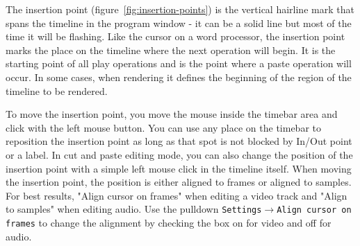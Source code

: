 The insertion point (figure~\ref{fig:insertion-points}) is the vertical hairline mark that spans the timeline in the program window - it can be a solid line but most of the time it will be flashing. 
Like the cursor on a word processor, the insertion point marks the place on the timeline where the next
operation will begin. It is the starting point of all play operations and is the point where a paste operation will occur. 
In some cases, when rendering it defines the beginning of the region of the timeline to be rendered. 

To move the insertion point, you move the mouse inside the timebar area and click with the left mouse button. 
You can use any place on the timebar to reposition the insertion point as long as that spot is not blocked
by In/Out point or a label. 
In cut and paste editing mode, you can also change the position of the insertion point with a simple 
left mouse click in the timeline itself.
When moving the insertion point, the position is either aligned to frames or aligned to samples. 
For best results, "Align cursor on frames" when editing a video track and "Align to samples" when editing audio. 
Use the pulldown \texttt{Settings$\rightarrow$Align cursor on frames} to change the alignment by
checking the box on for video and off for audio.


